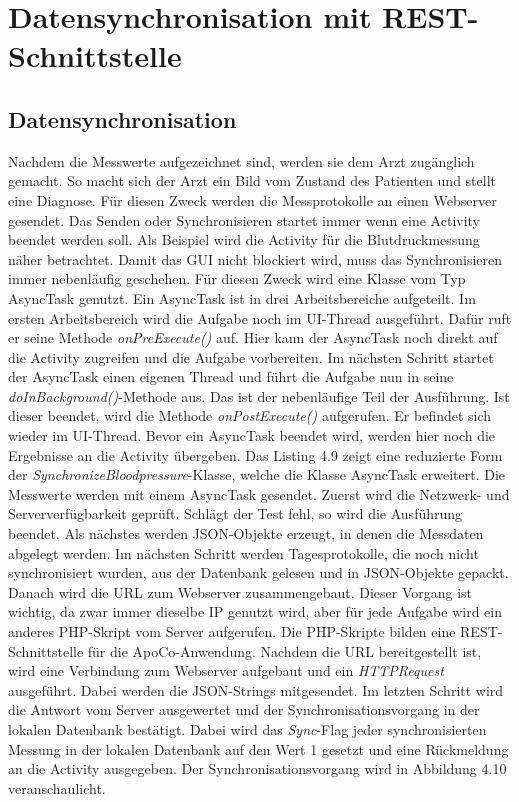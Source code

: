 

\section{Datensynchronisation mit REST-Schnittstelle} 

\subsection{Datensynchronisation}

Nachdem die Messwerte aufgezeichnet sind, werden sie dem Arzt zug\"anglich gemacht.
So macht sich der Arzt ein Bild vom Zustand des Patienten und stellt eine Diagnose.
F\"ur diesen Zweck werden die Messprotokolle an einen Webserver gesendet.
Das Senden oder Synchronisieren startet immer wenn eine Activity beendet werden soll.
Als Beispiel wird die Activity f\"ur die Blutdruckmessung n\"aher betrachtet.
Damit das GUI nicht blockiert wird, muss das Synchronisieren immer nebenl\"aufig geschehen.
F\"ur diesen Zweck wird eine Klasse vom Typ AsyncTask genutzt.
Ein AsyncTask ist in drei Arbeitsbereiche aufgeteilt.
Im ersten Arbeitsbereich wird die Aufgabe noch im UI-Thread ausgef\"uhrt.
Daf\"ur ruft er seine Methode \emph{onPreExecute()} auf.
Hier kann der AsyncTask noch direkt auf die Activity zugreifen und die Aufgabe vorbereiten.
Im n\"achsten Schritt startet der AsyncTask einen eigenen Thread und f\"uhrt
die Aufgabe nun in seine \emph{doInBackground()}-Methode aus.
Das ist der nebenl\"aufige Teil der Ausf\"uhrung.
Ist dieser beendet, wird die Methode \emph{onPostExecute()} aufgerufen.
Er befindet sich wieder im UI-Thread.
Bevor ein AsyncTask beendet wird, werden hier noch die Ergebnisse an die Activity \"ubergeben.
Das Listing 4.9 zeigt eine reduzierte Form der \emph{SynchronizeBloodpressure}-Klasse, welche die Klasse
AsyncTask erweitert.
Die Messwerte werden mit einem AsyncTask gesendet.
Zuerst wird die Netzwerk- und Serververf\"ugbarkeit gepr\"uft.
Schl\"agt der Test fehl, so wird die Ausf\"uhrung beendet.
Als n\"achstes werden JSON-Objekte erzeugt, in denen die Messdaten abgelegt werden.
Im n\"achsten Schritt werden Tagesprotokolle, die noch nicht synchronisiert wurden, aus der Datenbank gelesen und
in JSON-Objekte gepackt.
Danach wird die URL zum Webserver zusammengebaut.
Dieser Vorgang ist wichtig, da zwar immer dieselbe IP genutzt wird, aber f\"ur jede Aufgabe wird ein anderes 
PHP-Skript vom Server aufgerufen.
Die PHP-Skripte bilden eine REST-Schnittstelle f\"ur die ApoCo-Anwendung.
Nachdem die URL bereitgestellt ist, wird eine Verbindung zum Webserver aufgebaut und ein 
\emph{HTTPRequest} ausgef\"uhrt.
Dabei werden die JSON-Strings mitgesendet.
Im letzten Schritt wird die Antwort vom Server ausgewertet und der 
Synchronisationsvorgang in der lokalen Datenbank best\"atigt.
Dabei wird das \emph{Sync}-Flag jeder synchronisierten Messung in der lokalen Datenbank auf den 
Wert 1 gesetzt und eine R\"uckmeldung an die Activity ausgegeben.
Der Synchronisationsvorgang wird in Abbildung 4.10 veranschaulicht.\\

